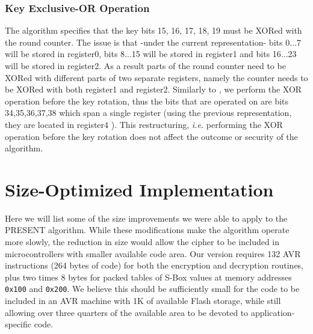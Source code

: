 \documentclass[11pt]{llncs2e} %
\begin{document}
\subsubsection{Key Exclusive-OR Operation} \label{key_xor}
The algorithm specifies that the key bits 15, 16, 17, 18, 19 must be XORed with the round counter. The issue is that -under the current representation- bits 0$\dots$7 will be stored in register0, bits 8$\dots$15 will be stored in register1 and bits 16$\dots$23 will be stored in register2. As a result parts of the round counter need to be XORed with different parts of two separate registers, namely the counter needs to be XORed with both register1 and register2. Similarly to \cite{eisenbarth2012compact}, we perform the XOR operation before the key rotation, thus the bits that are operated on are bits 34,35,36,37,38 which span a single register (using the previous representation, they are located in register4 ). This restructuring, \emph{i.e.} performing the XOR operation before the key rotation does not affect the outcome or security of the algorithm. 



\section{Size-Optimized Implementation}

Here we will list some of the size improvements we were able to apply to the PRESENT algorithm.
While these modifications make the algorithm operate more slowly, the reduction in size would allow the cipher to be included in microcontrollers with smaller available code area.
Our version requires 132 AVR instructions (264 bytes of code) for both the encryption and decryption routines, plus two times 8 bytes for packed tables of S-Box values at memory addresses \texttt{0x100} and \texttt{0x200}.
We believe this should be sufficiently small for the code to be included in an AVR machine with 1K of available Flash storage, while still allowing over three quarters of the available area to be devoted to application-specific code.
\end{document}

